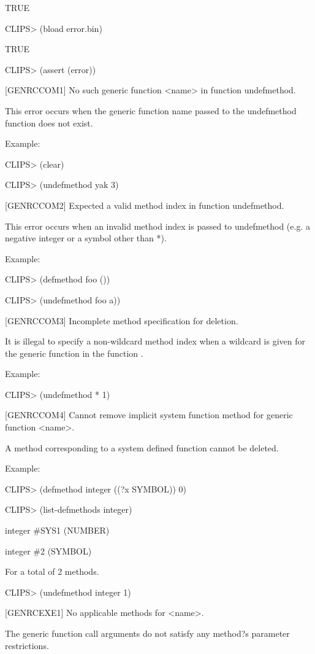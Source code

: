 \documentclass[letterpaper,10pt,english]{sphinxmanual}
\begin{document}
TRUE

CLIPS\textgreater{} (bload error.bin)

TRUE

CLIPS\textgreater{} (assert (error))

{[}GENRCCOM1{]} No such generic function \textless{}name\textgreater{} in function undefmethod.

This error occurs when the generic function name passed to the
undefmethod function does not exist.

Example:

CLIPS\textgreater{} (clear)

CLIPS\textgreater{} (undefmethod yak 3)

{[}GENRCCOM2{]} Expected a valid method index in function undefmethod.

This error occurs when an invalid method index is passed to undefmethod
(e.g. a negative integer or a symbol other than *).

Example:

CLIPS\textgreater{} (defmethod foo ())

CLIPS\textgreater{} (undefmethod foo a))

{[}GENRCCOM3{]} Incomplete method specification for deletion.

It is illegal to specify a non-wildcard method index when a wildcard is
given for the generic function in the function .

Example:

CLIPS\textgreater{} (undefmethod * 1)

{[}GENRCCOM4{]} Cannot remove implicit system function method for generic
function \textless{}name\textgreater{}.

A method corresponding to a system defined function cannot be deleted.

Example:

CLIPS\textgreater{} (defmethod integer ((?x SYMBOL)) 0)

CLIPS\textgreater{} (list-defmethods integer)

integer \#SYS1 (NUMBER)

integer \#2 (SYMBOL)

For a total of 2 methods.

CLIPS\textgreater{} (undefmethod integer 1)

{[}GENRCEXE1{]} No applicable methods for \textless{}name\textgreater{}.

The generic function call arguments do not satisfy any method?s
parameter restrictions.
\end{document}
